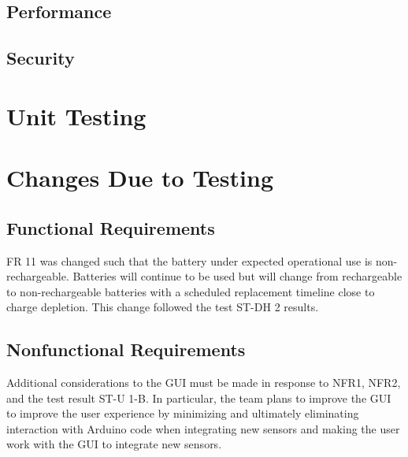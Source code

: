 \documentclass[12pt, titlepage]{article}
\begin{document}
\subsection{Performance}

\subsection{Security}

\section{Unit Testing}

\section{Changes Due to Testing}

\subsection{Functional Requirements}
FR 11 was changed such that the battery under expected operational use is non-rechargeable. Batteries will continue to be used but will change from rechargeable to non-rechargeable batteries with a scheduled replacement timeline close to charge depletion. This change followed the test ST-DH 2 results. \\

\subsection{Nonfunctional Requirements}


Additional considerations to the GUI must be made in response to NFR1,  NFR2, and the test result ST-U 1-B. In particular, the team plans to improve the GUI to improve the user experience by minimizing and ultimately eliminating interaction with Arduino code when integrating new sensors and making the user work with the GUI to integrate new sensors. \\
		
\end{document}
